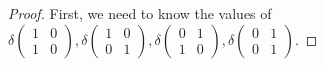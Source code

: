 \begin{Exercise}
\begin{proof}
First, we need to know the values of $\delta\begin{pmatrix}
1 & 0 \\
1 & 0
\end{pmatrix}, \delta\begin{pmatrix}
1 & 0 \\
0 & 1
\end{pmatrix}, \delta\begin{pmatrix}
0 & 1 \\
1 & 0
\end{pmatrix}, \delta\begin{pmatrix}
0 & 1 \\
0 & 1
\end{pmatrix}$.


\end{proof}
\end{Exercise}
